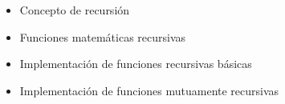 \begin{itemize}
\item[\basic] Concepto de recursión 
\item[\basic] Funciones matemáticas recursivas
\item[\basic] Implementación de funciones recursivas básicas
\item[\basic] Implementación de funciones mutuamente recursivas
\end{itemize}

